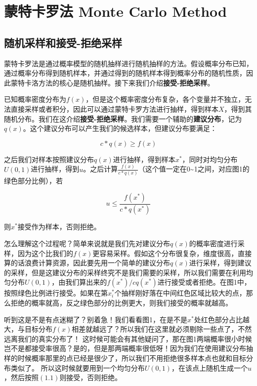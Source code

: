\section{蒙特卡罗法 Monte Carlo Method}

\subsection{随机采样和接受-拒绝采样}

蒙特卡罗法是通过概率模型的随机抽样进行随机抽样的方法。假设概率分布已知，通过概率分布得到随机样本，并通过得到的随机样本得到概率分布的随机性质，因此蒙特卡洛方法的核心是随机抽样。接下来我们介绍\textbf{接受-拒绝采样}。

已知概率密度分布为\(f(x)\)，但是这个概率密度分布复杂，各个变量并不独立，无法直接采样或者积分，因此可以通过蒙特卡罗方法进行抽样，得到样本\emph{\(X\)}，得到其随机分布。我们在这介绍\textbf{接受-拒绝采样}。我们需要一个辅助的\textbf{建议分布}，记为\(q(x)\)。这个建议分布可以产生我们的候选样本，但建议分布要满足：

\[c * q(x) \geq f(x)\]

之后我们对样本按照建议分布\(q(x)\)进行抽样，得到样本\(x^*\)，同时对均匀分布\(U(0,1)\)进行抽样，得到\(u\)。之后计算\(\frac{f(x)}{c*q(x)}\)（这个值一定在0\textasciitilde1之间，对应图1的绿色部分比例），若

\[u \leq \frac{f(x^*)}{c*q(x^*)}\]

则\(x^*\)接受作为样本，否则拒绝。

怎么理解这个过程呢？简单来说就是我们先对建议分布\(q(x)\)的概率密度进行采样，因为这个比我们的\(f(x)\)更容易采样。假如这个分布很复杂，维度很高，直接算的话浪费计算资源，因此要先用一个简单的建议分布\(q(x)\)进行采样，得到建议的采样，但是这建议分布的采样终究不是我们需要的采样，所以我们需要在利用均匀分布\(U(0,1)\)，由我们算出来的\(f(x^*)/cq(x^*)\)进行接受或者拒绝。在图1中，按照绿色比例进行接受。如果在第\(x^*_i\)个抽样刚好落在中间红色区域比较大的点，那么拒绝的概率就高，反之绿色部分的比例更大，则我们接受的概率就越高。

\begin{figure}
\centering
\caption{}
\end{figure}

听到这是不是有点迷糊了？别着急！我们看看图1，在是不是\(x^*\)处红色部分占比越大，与目标分布\(f(x)\)相差就越远了？所以我们在这里就必须剔除一些点了，不然远离我们的真实分布了！
这时候可能会有其他疑问了，那在图1两端概率很小时候岂不是都接受率很高？是的，但是那两端概率很低呀！因为我们在使用建议分布抽样的时候概率那里的点已经是很少了，所以我们不用拒绝很多样本点也就和目标分布类似了。
所以这时候就要用到一个均匀分布\(U(0,1)\)，在该点上随机生成一个\(u\)，然后按照\((1.1)\)则接受，否则拒绝。


